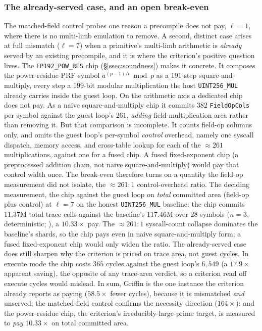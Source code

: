\subsubsection{The already-served case, and an open break-even}\label{sssec:already-served}
The matched-field control probes one reason a precompile does not pay, $\ell=1$, where there is no multi-limb emulation to remove. A second, distinct case arises at full mismatch ($\ell=7$) when a primitive's multi-limb arithmetic is \emph{already} served by an existing precompile, and it is where the criterion's positive question lives. The \texttt{FP192\_POW\_RES} chip (\S\ref{ssec:soundness}) makes it concrete. It composes the power-residue-PRF symbol $a^{(p-1)/t}\bmod p$ as a $191$-step square-and-multiply, every step a $199$-bit modular multiplication the host \texttt{UINT256\_MUL} already carries inside the guest loop. On the arithmetic axis a dedicated chip does not pay. As a naive square-and-multiply chip it commits $382$ \texttt{FieldOpCols} per symbol against the guest loop's $261$, \emph{adding} field-multiplication area rather than removing it. But that comparison is incomplete. It counts field-op columns only, and omits the guest loop's per-symbol \emph{control} overhead, namely one syscall dispatch, memory access, and cross-table lookup for each of the ${\approx}261$ multiplications, against one for a fused chip. A fused fixed-exponent chip (a preprocessed addition chain, not naive square-and-multiply) would pay that control width once. The break-even therefore turns on a quantity the field-op measurement did not isolate, the ${\approx}261{:}1$ control-overhead ratio. The deciding measurement, the chip against the guest loop on \emph{total} committed area (field-op plus control) at $\ell=7$ on the honest \texttt{UINT256\_MUL} baseline: the chip commits $11.37$M total trace cells against the baseline's $117.46$M over $28$ symbols ($n{=}3$, deterministic; ), a $10.33\times$ pay. The ${\approx}261{:}1$ syscall-count collapse dominates the baseline's shards, so the chip pays even in naive square-and-multiply form; a fused fixed-exponent chip would only widen the ratio. The already-served case does still sharpen why the criterion is priced on trace area, not guest cycles. In execute mode the chip costs $365$ cycles against the guest loop's $6{,}549$ (a $17.9\times$ apparent saving), the opposite of any trace-area verdict, so a criterion read off execute cycles would mislead. In sum, Griffin is the one instance the criterion already reports as paying ($58.5\times$ fewer cycles), because it is mismatched \emph{and} unserved; the matched-field control confirms the necessity direction ($164\times$); and the power-residue chip, the criterion's irreducibly-large-prime target, is measured to \emph{pay} $10.33\times$ on total committed area.

